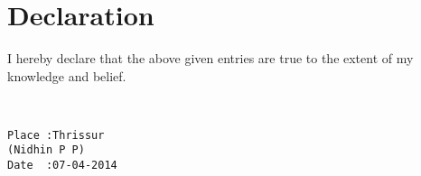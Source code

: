 \documentclass[11pt,a4paper]{moderncv}
\begin{document}

	
\section{Declaration}

I hereby declare that the above given entries are true to the extent of my knowledge and belief. 
\begin{verbatim}


Place :Thrissur                                                          (Nidhin P P)
Date  :07-04-2014 
\end{verbatim}
	
	
\end{document}

